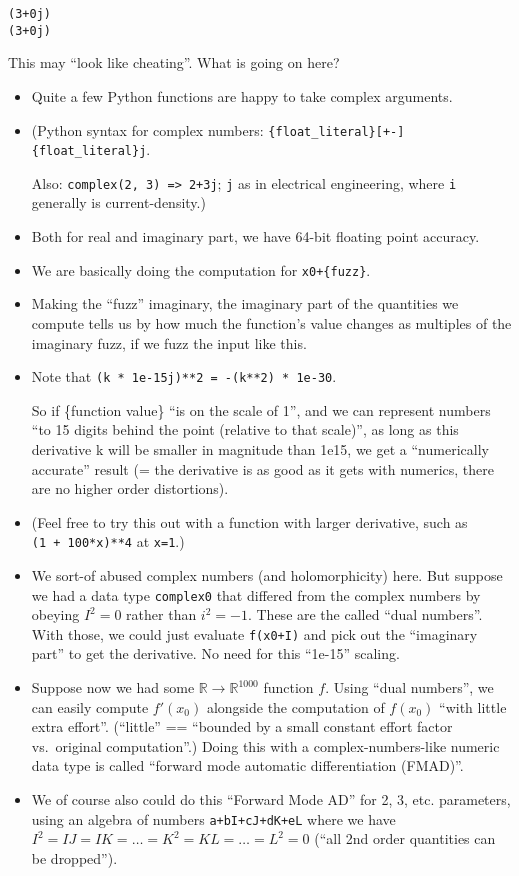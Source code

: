 \documentclass[11pt]{article}
\begin{document}
    \begin{Verbatim}[commandchars=\\\{\}]
(3+0j)
(3+0j)
    \end{Verbatim}

    This may ``look like cheating''. What is going on here?

\begin{itemize}
\item
  Quite a few Python functions are happy to take complex arguments.
\item
  (Python syntax for complex numbers:
  \texttt{\{float\_literal\}{[}+-{]}\{float\_literal\}j}.

  Also: \texttt{complex(2,\ 3)\ =\textgreater{}\ 2+3j}; \texttt{j} as in
  electrical engineering, where \texttt{i} generally is
  current-density.)
\item
  Both for real and imaginary part, we have 64-bit floating point
  accuracy.
\item
  We are basically doing the computation for \texttt{x0+\{fuzz\}}.
\item
  Making the ``fuzz'' imaginary, the imaginary part of the quantities we
  compute tells us by how much the function's value changes as multiples
  of the imaginary fuzz, if we fuzz the input like this.
\item
  Note that \texttt{(k\ *\ 1e-15j)**2\ =\ -(k**2)\ *\ 1e-30}.

  So if \{function value\} ``is on the scale of 1'', and we can
  represent numbers ``to 15 digits behind the point (relative to that
  scale)'', as long as this derivative k will be smaller in magnitude
  than 1e15, we get a ``numerically accurate'' result (= the derivative
  is as good as it gets with numerics, there are no higher order
  distortions).
\item
  (Feel free to try this out with a function with larger derivative,
  such as \texttt{(1\ +\ 100*x)**4} at \texttt{x=1}.)
\item
  We sort-of abused complex numbers (and holomorphicity) here. But
  suppose we had a data type \texttt{complex0} that differed from the
  complex numbers by obeying \(I^2=0\) rather than \(i^2=-1\). These are
  the called ``dual numbers''. With those, we could just evaluate
  \texttt{f(x0+I)} and pick out the ``imaginary part'' to get the
  derivative. No need for this ``1e-15'' scaling.
\item
  Suppose now we had some \({\mathbb R}\to {\mathbb R^{1000}}\) function
  \(f\). Using ``dual numbers'', we can easily compute \(f'(x_0)\)
  alongside the computation of \(f(x_0)\) ``with little extra effort''.
  (``little'' == ``bounded by a small constant effort factor
  vs.~original computation''.) Doing this with a complex-numbers-like
  numeric data type is called ``forward mode automatic differentiation
  (FMAD)''.
\item
  We of course also could do this ``Forward Mode AD'' for 2, 3, etc.
  parameters, using an algebra of numbers \texttt{a+bI+cJ+dK+eL} where
  we have \(I^2=IJ=IK=\ldots=K^2=KL=\ldots=L^2=0\) (``all 2nd order
  quantities can be dropped'').


\end{itemize}
\end{document}

